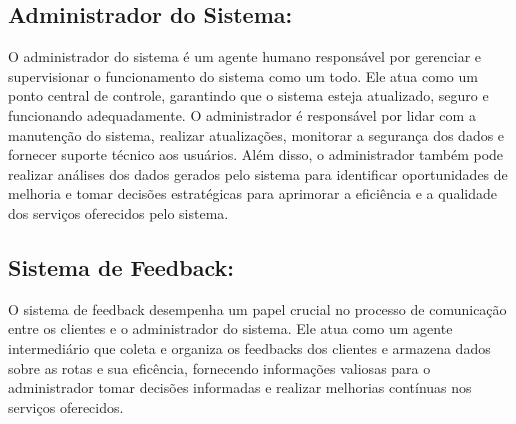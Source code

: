 \subsection{Administrador do Sistema:} 
O administrador do sistema é um agente humano responsável por gerenciar e supervisionar o funcionamento do sistema como um todo. Ele atua como um ponto central de controle, garantindo que o sistema esteja atualizado, seguro e funcionando adequadamente. O administrador é responsável por lidar com a manutenção do sistema, realizar atualizações, monitorar a segurança dos dados e fornecer suporte técnico aos usuários. Além disso, o administrador também pode realizar análises dos dados gerados pelo sistema para identificar oportunidades de melhoria e tomar decisões estratégicas para aprimorar a eficiência e a qualidade dos serviços oferecidos pelo sistema.

\subsection{Sistema de Feedback:}

O sistema de feedback desempenha um papel crucial no processo de comunicação entre os clientes e o administrador do sistema. Ele atua como um agente intermediário que coleta e organiza os feedbacks dos clientes e armazena dados sobre as rotas e sua eficência, fornecendo informações valiosas para o administrador tomar decisões informadas e realizar melhorias contínuas nos serviços oferecidos.